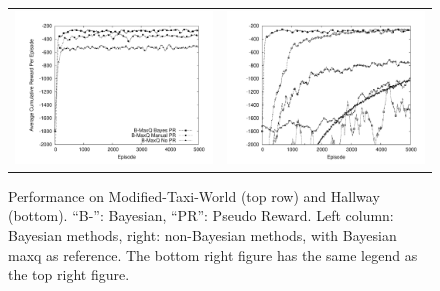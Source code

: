 \begin{figure}[t]
\begin{tabular}{cc}
\includegraphics[trim=50 50 30 50, clip, scale=0.25]{exp/Hallwayb.pdf} & 
\includegraphics[trim=50 50 30 50, clip, scale=0.25]{exp/Hallwaynb.pdf} \\
\end{tabular}
\caption{Performance on {\sf Modified-Taxi-World} (top row) and {\sf Hallway} (bottom). ``B-'': Bayesian, ``PR'': Pseudo Reward. Left
column: Bayesian methods, right: non-Bayesian methods, with
Bayesian {\sc maxq} as reference. The bottom right figure has the same
legend as the top right figure.}\label{fig:pr}
\vspace{-0.2in}\end{figure}

